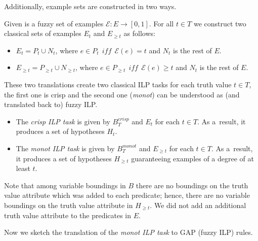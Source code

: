 Additionally, example sets are constructed in two ways.
\begin{definition}
Given is a fuzzy set of examples ${\mathcal E}:E\longrightarrow [0,1]$. For all $t\in T$ we construct two classical sets of examples $E_t$ and $E_{\ge t}$  as follows:
\begin{itemize}
	\item $E_t=P_t\cup N_t$, where 
$e\in P_t \ \ iff \ \ {\mathcal E}(e)= t$
and $N_t$ is the rest of $E$.
	\item $E_{\ge t}=P_{\ge t}\cup N_{\ge t}$, where 
$e\in P_{\ge t} \ \ iff \ \ {\mathcal E}(e)\ge t$
and $N_t$ is the rest of $E$.
\end{itemize}
\end{definition}



These two translations create two classical ILP tasks for each truth value $t\in T$, the first one is crisp and the second one (\emph{monot}) can be understood as (and translated back to) fuzzy ILP.

\begin{itemize}
	\item The \textit{crisp ILP task} is given by $B^{crisp}_{T}$ and $E_t$ for each $t\in T$.  As a~result, it produces a set of hypotheses $H_t$.

	\item The \textit{monot ILP task} is given by ${B}^{monot}_T$ and $E_{\ge t}$ for each $t\in T$. As a~result, it produces a set of hypotheses $H_{\ge t}$ guaranteeing examples of a degree of at least $t$.
\end{itemize}

Note that among variable boundings in $B$ there are no boundings on the truth value attribute which was added to each predicate; hence, there are no variable boundings on the truth value attribute in $H_{\ge t}$. We did not add an additional truth value attribute to the predicates in $E$. 

Now we sketch the translation of the \emph{monot ILP task} to GAP (fuzzy ILP) rules. 

